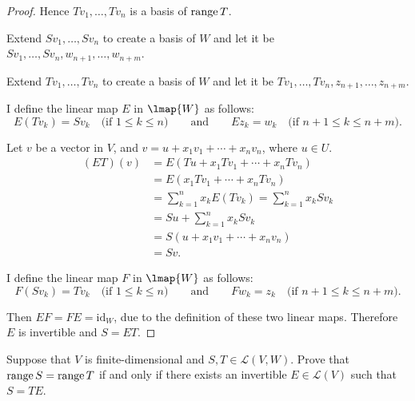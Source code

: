 \begin{proof}
    Hence $Tv_{1}, \ldots, Tv_{n}$ is a basis of $\text{range}\,{T}$.

    Extend $Sv_{1}, \ldots, Sv_{n}$ to create a basis of $W$ and let it be $Sv_{1}, \ldots, Sv_{n}, w_{n+1}, \ldots, w_{n+m}$.

    Extend $Tv_{1}, \ldots, Tv_{n}$ to create a basis of $W$ and let it be $Tv_{1}, \ldots, Tv_{n}, z_{n+1}, \ldots, z_{n+m}$.

    I define the linear map $E$ in $\lmap{W}$ as follows:
    \[
        E(Tv_{k}) = Sv_{k}\quad \text{(if $1\leq k\leq n$)} \qquad\text{and}\qquad Ez_{k} = w_{k} \quad\text{(if $n+1\leq k\leq n+m$)}.
    \]

    Let $v$ be a vector in $V$, and $v = u + x_{1}v_{1} + \cdots + x_{n}v_{n}$, where $u\in U$.
    \begin{align*}
        (ET)(v) & = E(Tu + x_{1}Tv_{1} + \cdots + x_{n}Tv_{n})               \\
                & = E(x_{1}Tv_{1} + \cdots + x_{n}Tv_{n})                    \\
                & = \sum^{n}_{k=1}x_{k}E(Tv_{k}) = \sum^{n}_{k=1}x_{k}Sv_{k} \\
                & = Su + \sum^{n}_{k=1}x_{k}Sv_{k}                           \\
                & = S(u + x_{1}v_{1} + \cdots + x_{n}v_{n})                  \\
                & = Sv.
    \end{align*}

    I define the linear map $F$ in $\lmap{W}$ as follows:
    \[
        F(Sv_{k}) = Tv_{k}\quad \text{(if $1\leq k\leq n$)} \qquad\text{and}\qquad Fw_{k} = z_{k} \quad\text{(if $n+1\leq k\leq n+m$)}.
    \]

    Then $EF = FE = \text{id}_{W}$, due to the definition of these two linear maps. Therefore $E$ is invertible and $S = ET$.
\end{proof}
\newpage

\begin{exercise}
    Suppose that $V$ is finite-dimensional and $S, T \in \mathcal{L}(V, W)$. Prove that $\text{range}\,{S} = \text{range}\,{T}$ if and only if there exists an invertible $E \in \mathcal{L}(V)$ such that $S = TE$.
\end{exercise}

